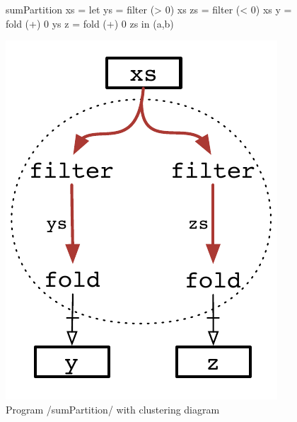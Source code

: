 \begin{figure}
\begin{minipage}{0.5\textwidth}
\begin{haskell}
sumPartition xs 
 = let ys = filter (> 0) xs
       zs = filter (< 0) xs
       y  = fold   (+) 0 ys
       z  = fold   (+) 0 zs
   in  (a,b)
\end{haskell}
\end{minipage}
\begin{minipage}{0.5\textwidth}
\begin{center}
\includegraphics[scale=0.5]{copy/03-body/clustering/figures/ex4-concestors.pdf}
\end{center}
\end{minipage}
\caption{Program \Hs/sumPartition/ with clustering diagram}
\label{clustering:f:concestors}
\end{figure}

